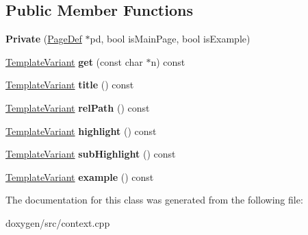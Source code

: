\subsection*{Public Member Functions}
\begin{DoxyCompactItemize}
\item 
\mbox{\label{class_page_context_1_1_private_afbae8a434b8eb99dcb3d8ec022b6ba0b}} 
{\bfseries Private} (\mbox{\hyperlink{class_page_def}{Page\+Def}} $\ast$pd, bool is\+Main\+Page, bool is\+Example)
\item 
\mbox{\label{class_page_context_1_1_private_a615d13a2cfe35e6e8f7a73d79a7fe41e}} 
\mbox{\hyperlink{class_template_variant}{Template\+Variant}} {\bfseries get} (const char $\ast$n) const
\item 
\mbox{\label{class_page_context_1_1_private_ab08c5d6e55d04c1726b48b43c29d3df7}} 
\mbox{\hyperlink{class_template_variant}{Template\+Variant}} {\bfseries title} () const
\item 
\mbox{\label{class_page_context_1_1_private_a02cef2d0e3d2565eb9346acd10f14ee3}} 
\mbox{\hyperlink{class_template_variant}{Template\+Variant}} {\bfseries rel\+Path} () const
\item 
\mbox{\label{class_page_context_1_1_private_a2cb0a39303dbaeda24b01ebd2bec10ba}} 
\mbox{\hyperlink{class_template_variant}{Template\+Variant}} {\bfseries highlight} () const
\item 
\mbox{\label{class_page_context_1_1_private_ad8e3373a0d00c07a50447a2ef914abf5}} 
\mbox{\hyperlink{class_template_variant}{Template\+Variant}} {\bfseries sub\+Highlight} () const
\item 
\mbox{\label{class_page_context_1_1_private_ade7aed834005faa91f7b7bff210057b9}} 
\mbox{\hyperlink{class_template_variant}{Template\+Variant}} {\bfseries example} () const
\end{DoxyCompactItemize}


The documentation for this class was generated from the following file\+:\begin{DoxyCompactItemize}
\item 
doxygen/src/context.\+cpp\end{DoxyCompactItemize}
